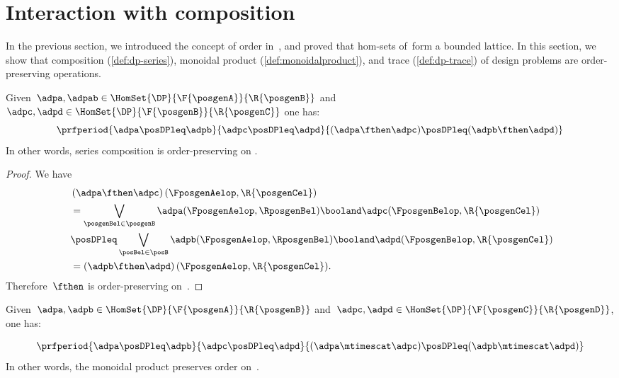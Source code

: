 
\section{Interaction with composition}
In the previous section, we introduced the concept of order in~\DP, and proved that hom-sets of~\DP form a bounded lattice.
In this section, we show that composition (\cref{def:dp-series}), monoidal product (\cref{def:monoidalproduct}), and trace (\cref{def:dp-trace}) of design problems are order-preserving operations.

\begin{lemma}
    \label{lem:series_pres_order}
    Given~$\adpa,\adpab \in \HomSet{\DP}{\F{\posgenA}}{\R{\posgenB}}$ and~$\adpc,\adpd \in \HomSet{\DP}{\F{\posgenB}}{\R{\posgenC}}$ one has:
    \begin{equation}
        \prfperiod{
            \adpa\posDPleq \adpb
        }{
            \adpc\posDPleq \adpd
        }{
            (\adpa\fthen \adpc) \posDPleq (\adpb\fthen \adpd)
        }
    \end{equation}
    In other words, series composition is order-preserving on \DP.
\end{lemma}

\begin{proof}
    We have
    \begin{equation}
        \label{eq:series_pres_ord}
        \begin{aligned}
            ~ & \left( \adpa\fthen \adpc\right)(\FposgenAelop,\R{\posgenCel})\\
              & = \bigvee_{\posgenBel\in \posgenB}\adpa(\FposgenAelop,\RposgenBel)\booland \adpc(\FposgenBelop,\R{\posgenCel})\\
              & \posDPleq \bigvee_{\posBel\in \posB} \adpb(\FposgenAelop,\RposgenBel)\booland \adpd(\FposgenBelop,\R{\posgenCel}) \\
              & =\left( \adpb\fthen \adpd\right)(\FposgenAelop,\R{\posgenCel}).
        \end{aligned}
    \end{equation}
    Therefore~$\fthen$ is order-preserving on~\DP.
\end{proof}

\begin{lemma}
    \label{lem:tens_pres_order}
    Given~$\adpa,\adpb \in \HomSet{\DP}{\F{\posgenA}}{\R{\posgenB}}$ and~$\adpc,\adpd \in \HomSet{\DP}{\F{\posgenC}}{\R{\posgenD}}$, one has:

    \begin{equation}
        \prfperiod{
            \adpa\posDPleq \adpb
        }{
            \adpc\posDPleq \adpd
        }{
            (\adpa\mtimescat \adpc )\posDPleq (\adpb\mtimescat \adpd)
        }
    \end{equation}
    In other words, the monoidal product preserves order on~\DP.
\end{lemma}


